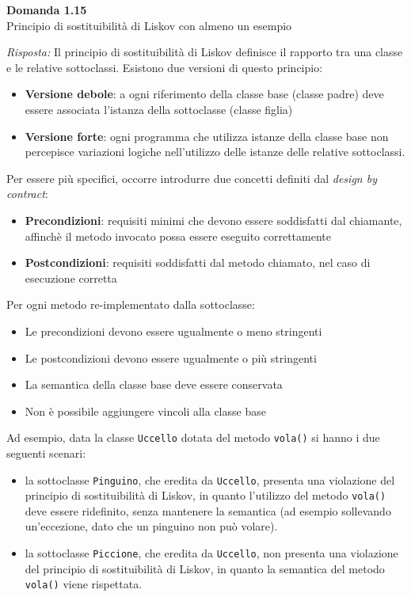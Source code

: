\documentclass{article}
\newenvironment{problem}[2][Domanda]
    { \begin{mdframed}[backgroundcolor=gray!20] \textbf{#1 #2} \\}
    {  \end{mdframed}}
\newenvironment{solution}
    {\textit{Risposta:}}
    {}
\begin{document}
\begin{problem}{1.15}
Principio di sostituibilità di Liskov con almeno un esempio
\end{problem}
\begin{solution}
Il principio di sostituibilità di Liskov definisce il rapporto tra una classe e le relative sottoclassi.
Esistono due versioni di questo principio:
\begin{itemize}
	\item \textbf{Versione debole}: a ogni riferimento della classe base (classe padre) deve essere associata l'istanza della sottoclasse (classe figlia)
	\item \textbf{Versione forte}: ogni programma che utilizza istanze della classe base non percepisce variazioni logiche nell'utilizzo delle istanze delle relative sottoclassi.
\end{itemize}
Per essere più specifici, occorre introdurre due concetti definiti dal \textit{design by contract}:
\begin{itemize}
	\item \textbf{Precondizioni}: requisiti minimi che devono essere soddisfatti dal chiamante, affinchè il metodo invocato possa essere eseguito correttamente
	\item \textbf{Postcondizioni}: requisiti soddisfatti dal metodo chiamato, nel caso di esecuzione corretta
\end{itemize}
Per ogni metodo re-implementato dalla sottoclasse:
\begin{itemize}
	\item Le precondizioni devono essere ugualmente o meno stringenti
	\item Le postcondizioni devono essere ugualmente o più stringenti
	\item La semantica della classe base deve essere conservata
	\item Non è possibile aggiungere vincoli alla classe base
\end{itemize}
Ad esempio, data la classe \texttt{Uccello} dotata del metodo \texttt{vola()} si hanno i due seguenti scenari:
\begin{itemize}
	\item la sottoclasse \texttt{Pinguino}, che eredita da \texttt{Uccello}, presenta una violazione del principio di sostituibilità di Liskov, in quanto l'utilizzo del metodo \texttt{vola()} deve essere ridefinito, senza mantenere la semantica (ad esempio sollevando un'eccezione, dato che un pinguino non può volare).
	\item la sottoclasse \texttt{Piccione}, che eredita da \texttt{Uccello}, non presenta una violazione del principio di sostituibilità di Liskov, in quanto la semantica del metodo \texttt{vola()} viene rispettata.
\end{itemize}
\end{solution}
\end{document}
